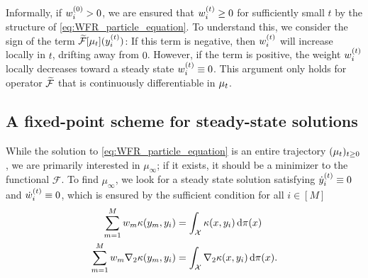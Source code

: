 Informally, if $w^{(0)}_{i} > 0$, we are ensured that $w_{i}^{(t)} \geq 0$ for sufficiently small $t$ %
by the structure of \eqref{eq:WFR_particle_equation}. To understand this, we consider the sign of the term $\widetilde{\mathcal{F}}[\mu_t](y_{i}^{(t)})$: If this term is negative, then $w_{i}^{(t)}$ will increase locally in $t$, drifting away from $0$. However, if the term is positive, the weight $w_{i}^{(t)}$ locally decreases toward a steady state $w_{i}^{(t)}\equiv 0$. This argument only holds for operator $\widetilde{\mathcal{F}}$ that is continuously differentiable in $\mu_{t}$.













\subsection{A fixed-point scheme for steady-state solutions}\label{sec:msip}










While the solution to \eqref{eq:WFR_particle_equation} is an entire trajectory $(\mu_{t})_{t\geq 0}$, we are primarily interested in $\mu_{\infty}$; if it exists, it should be a minimizer to the functional $\mathcal{F}$. To find $\mu_\infty$, we look for a steady state solution satisfying $\dot{y}_{i}^{(t)}\equiv 0$ and $\dot{w}_{i}^{(t)}\equiv 0$, which is ensured by the sufficient condition for all $i \in [M]$
\begin{align}
       \sum\limits_{m = 1}^{M} w_{m} \kappa(y_{m},y_{i}) & = \int_{\mathcal{X}} \kappa(x,y_{i}) \,\mathrm{d}\pi(x) \label{eq:mixture_diracs_kbar_eq_1}\\
       \sum\limits_{m = 1}^{M} w_{m} \nabla_{2} \kappa(y_{m},y_{i}) & = \int_{\mathcal{X}} \nabla_{2} \kappa(x,y_{i}) \,\mathrm{d}\pi(x). \label{eq:MMD_gradient_mixture}
\end{align}

